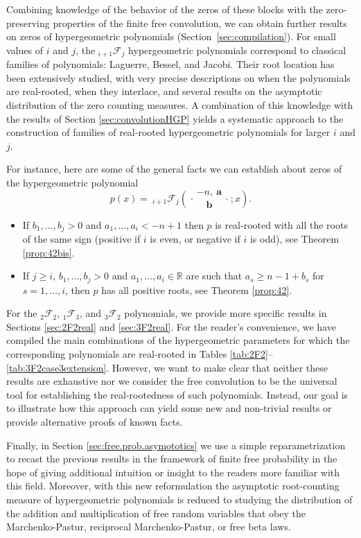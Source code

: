 \documentclass[reqno,11pt]{amsart}
\theoremstyle{remark}
\newcommand{\rr}{\mathbb{R}}
\newcommand*\pFq[5]{%
 {\ }_{#1}{\mathcal F}_{#2}{\left(\genfrac..{0pt}{}{#3}{#4};#5\right)}%
}
\begin{document}
Combining knowledge of the behavior of the zeros of these blocks with the zero-preserving properties of the finite free convolution, we can obtain further results on zeros of hypergeometric polynomials (Section~\ref{sec:compilation}). For small values of $i$ and $j$, the ${}_{i+1}\mathcal{F}_{j}$ hypergeometric polynomials correspond to classical families of polynomials: Laguerre, Bessel, and Jacobi. Their root location has been extensively studied, with very precise descriptions on when the polynomials are real-rooted, when they interlace, and several results on the asymptotic distribution of the zero counting measures.
A combination of this knowledge with the results of Section \ref{sec:convolutionHGP} yields a systematic approach to the construction of families of real-rooted hypergeometric polynomials for larger $i$ and $j$. 

For instance, here are some of the general facts we can establish about zeros of the hypergeometric polynomial 
$$
p(x)= \pFq{i+1}{j}{-n,\ \bm a}{ \bm b}{x}.
$$
\begin{itemize}
    \item If $b_1,\dots, b_j>0$ and  $a_1,\dots,a_i<-n+1$ then $p$ is real-rooted with all the roots of the same sign (positive if $i$ is even, or negative if $i$ is odd), see Theorem \ref{prop:42bis}.

    \item If $j\geq i$, $b_1,\dots, b_j > 0$ and $a_1,\dots, a_i\in \rr$ are such that $a_s\geq n-1+b_s$ for $s=1,\dots,i$, then $p$ has all positive roots, see Theorem \ref{prop:42}.
\end{itemize}

For the ${}_{2}\mathcal{F}_{2}$, ${}_{1}\mathcal{F}_{3}$, and ${}_{3}\mathcal{F}_{2}$ polynomials, we provide more specific results in Sections \ref{sec:2F2real} and \ref{sec:3F2real}. For the reader's convenience, we have compiled the main combinations of the hypergeometric parameters for which the corresponding polynomials are real-rooted in Tables \ref{tab:2F2}--\ref{tab:3F2case3extension}. However, we want to make clear that neither these results are exhaustive nor we consider the free convolution to be the universal tool for establishing the real-rootedness of such polynomials. Instead, our goal is to illustrate how this approach can yield some new and non-trivial results or provide alternative proofs of known facts. 

Finally, in Section \ref{sec:free.prob.asymototics} we use a simple reparametrization to recast the previous results in the framework of finite free probability in the hope of giving additional intuition or insight to the readers more familiar with this field.  Moreover, with this new reformulation the asymptotic root-counting measure of hypergeometric polynomials is reduced to studying the distribution of the addition and multiplication of free random variables that obey the Marchenko-Pastur, reciprocal Marchenko-Pastur, or free beta laws.
\end{document}
